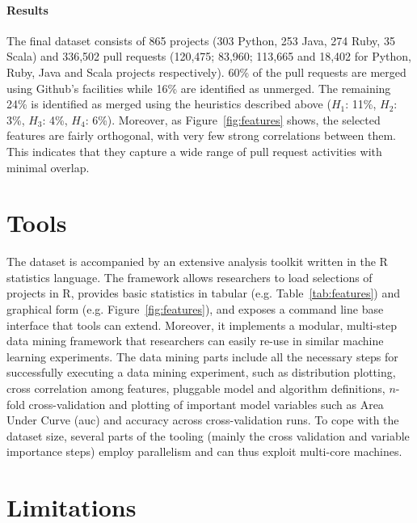 \documentclass{sig-alternate}
\begin{document}
\paragraph*{Results} The final dataset consists of 865 projects (303 Python, 253 Java, 274 Ruby, 35 Scala) and 336,502 pull requests (120,475; 83,960; 113,665 and 18,402 for Python,
Ruby, Java and Scala pro\-je\-cts respectively). 60\% of the pull requests are
merged using Github's facilities while 16\% are identified as unmerged.
The remaining 24\% is identified as merged using the heuristics described
above ($H_1$: 11\%, $H_2$: 3\%, $H_3$: 4\%, $H_4$: 6\%).
Moreover, as Figure~\ref{fig:features} shows,
the selected features are fairly orthogonal, with very few strong correlations
between them. This indicates that they capture a wide range of pull
request activities with minimal overlap.

\section{Tools}

The \pullreqs dataset is accompanied by an extensive analysis toolkit written in
the R statistics language. The framework allows researchers to load selections
of projects in R, provides basic statistics in tabular (e.g.
Table~\ref{tab:features}) and graphical form (e.g. Figure~\ref{fig:features}),
and exposes a command line base interface that tools can extend. Moreover, it
implements a modular, multi-step data mining framework that researchers can
easily re-use in similar machine learning experiments. The data mining parts
include all the necessary steps for successfully executing a data mining
experiment, such as distribution plotting, cross correlation among features,
pluggable model and algorithm definitions, $n$-fold cross-validation and
plotting of important model variables such as Area Under Curve ({\sc auc}) and
accuracy across cross-validation runs. To cope with the \pullreqs dataset size,
several parts of the tooling (mainly the cross validation and variable
importance steps) employ parallelism and can thus exploit multi-core machines.

\section{Limitations}
\end{document}
